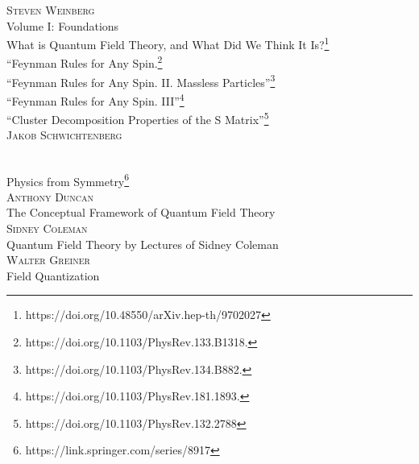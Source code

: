 \vspace*{\fill}
\begin{center}
{

{\Large \textsc{Steven Weinberg}}\\[1em]
{
 Volume I: Foundations\\[0.5em]
What is Quantum Field Theory, and What Did We Think It Is?\footnote{https://doi.org/10.48550/arXiv.hep-th/9702027}\\[0.5em]

“Feynman Rules for Any Spin.\footnote{https://doi.org/10.1103/PhysRev.133.B1318.}\\[0.5em]
 “Feynman Rules for Any Spin. II. Massless Particles”\footnote{https://doi.org/10.1103/PhysRev.134.B882.}\\[0.5em]
 “Feynman Rules for Any Spin. III”\footnote{https://doi.org/10.1103/PhysRev.181.1893.}\\[0.5em]
 “Cluster Decomposition Properties of the S Matrix”\footnote{https://doi.org/10.1103/PhysRev.132.2788}
}\\[2.2em]
\Large \textsc{Jakob Schwichtenberg}}\\[1em]
{
Physics from Symmetry\footnote{https://link.springer.com/series/8917}
}\\[2.2em]


{\Large \textsc{Anthony Duncan}}\\[1em]
{
The Conceptual Framework of Quantum Field Theory
}\\[2.2em]

{\Large \textsc{Sidney Coleman}}\\[1em]
{
Quantum Field Theory  by Lectures of Sidney Coleman
}\\[2.2em]

{\Large \textsc{Walter Greiner}}\\[1em]
{
Field Quantization%
}\\[2.2em]




\end{center}
\vspace*{\fill}

